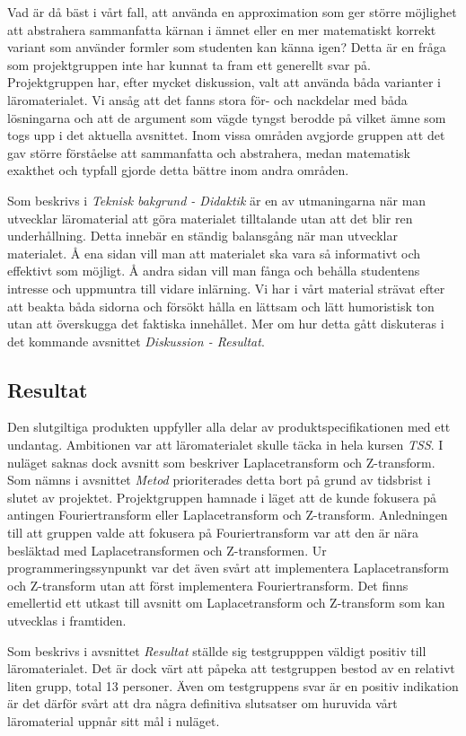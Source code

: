 \documentclass[]{article}
\begin{document}
Vad är då bäst i vårt fall, att använda en approximation som ger
större möjlighet att abstrahera
sammanfatta kärnan i ämnet eller
en mer matematiskt korrekt variant som använder formler som studenten
kan känna igen? Detta är en fråga som projektgruppen inte har kunnat
ta fram ett generellt svar på. Projektgruppen har, efter mycket
diskussion, valt att använda båda varianter i läromaterialet. Vi ansåg
att det fanns stora för- och nackdelar med båda lösningarna och att de
argument som vägde tyngst berodde på vilket ämne som togs upp i det
aktuella avsnittet. Inom vissa områden avgjorde gruppen att det gav
större förståelse att sammanfatta och abstrahera, medan matematisk
exakthet och typfall gjorde detta bättre inom andra områden.

Som beskrivs i \textit{Teknisk bakgrund - Didaktik} är en av
utmaningarna när man utvecklar läromaterial att göra materialet
tilltalande utan att det blir ren underhållning. Detta innebär en
ständig balansgång när man utvecklar materialet. Å ena sidan vill man
att materialet ska vara så informativt och effektivt som möjligt. Å
andra sidan vill man fånga och behålla studentens intresse och
uppmuntra till vidare inlärning. Vi har i vårt material strävat efter
att beakta båda sidorna och försökt hålla en lättsam och lätt
humoristisk ton utan att överskugga det faktiska innehållet. Mer om
hur detta gått diskuteras i det kommande avsnittet \textit{Diskussion
 - Resultat}.

\subsection{Resultat}
Den slutgiltiga produkten uppfyller alla delar av
produktspecifikationen med ett undantag. Ambitionen var att
läromaterialet skulle täcka in hela kursen \textit{TSS}. I nuläget
saknas dock avsnitt som beskriver Laplacetransform och
Z-transform. Som nämns i avsnittet \textit{Metod} prioriterades
detta bort på grund av tidsbrist i slutet av projektet. Projektgruppen
hamnade i läget att de kunde fokusera på antingen Fouriertransform
eller Laplacetransform och Z-transform. Anledningen till att
gruppen valde att fokusera på Fouriertransform var att den är nära
besläktad med Laplacetransformen och Z-transformen. Ur
programmeringssynpunkt var det även svårt att implementera
Laplacetransform och Z-transform utan att först implementera Fouriertransform. Det finns emellertid ett utkast
till avsnitt om Laplacetransform och Z-transform som kan utvecklas i framtiden.

Som beskrivs i avsnittet \textit{Resultat} ställde sig testgrupppen
väldigt positiv till läromaterialet. Det är dock värt att påpeka att
testgruppen bestod av en relativt liten grupp, total 13 personer.
Även om testgruppens svar är en positiv indikation är det därför svårt
att dra några definitiva slutsatser om huruvida vårt läromaterial
uppnår sitt mål i nuläget.
\end{document}

